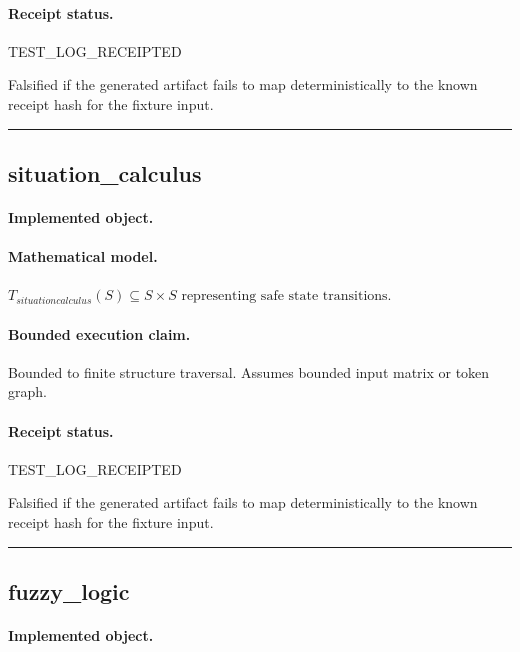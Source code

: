 \paragraph{Receipt status.} TEST\_LOG\_RECEIPTED
\begin{falsifier}
Falsified if the generated artifact fails to map deterministically to the known receipt hash for the fixture input.
\end{falsifier}

\vspace{1em}\hrule\vspace{1em}
\subsection{situation\_calculus}
\paragraph{Implemented object.} 
\paragraph{Mathematical model.} $T_{situationcalculus}(S) \subseteq S \times S \text{ representing safe state transitions}.$
\paragraph{Bounded execution claim.} Bounded to finite structure traversal. Assumes bounded input matrix or token graph.
\paragraph{Receipt status.} TEST\_LOG\_RECEIPTED
\begin{falsifier}
Falsified if the generated artifact fails to map deterministically to the known receipt hash for the fixture input.
\end{falsifier}

\vspace{1em}\hrule\vspace{1em}
\subsection{fuzzy\_logic}
\paragraph{Implemented object.} 

